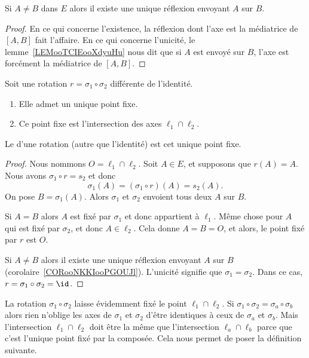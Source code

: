 \begin{corollary}       \label{CORooNKKIooPGOUJl}
	Si \( A\neq B\) dans \( E\) alors il existe une unique réflexion envoyant \( A\) sur \( B\).
\end{corollary}

\begin{proof}
	En ce qui concerne l'existence, la réflexion dont l'axe est la médiatrice de \( [A,B]\) fait l'affaire. En ce qui concerne l'unicité, le lemme~\ref{LEMooTCIEooXdyuHu} nous dit que si \( A\) est envoyé sur \( B\), l'axe est forcément la médiatrice de \( [A,B]\).
\end{proof}

\begin{lemmaDef}        \label{LEMooIJELooLWqBfE}
	Soit une rotation \( r=\sigma_1\circ\sigma_2\) différente de l'identité.
	\begin{enumerate}
		\item
		      Elle admet un unique point fixe.
		\item
		      Ce point fixe est l'intersection des axes \( \ell_1\cap\ell_2\).
	\end{enumerate}

	Le  d'une rotation (autre que l'identité) est cet unique point fixe.
\end{lemmaDef}

\begin{proof}
	Nous nommons \( O=\ell_1\cap\ell_2\). Soit \( A\in E\), et supposons que \( r(A)=A\). Nous avons \( \sigma_1\circ r=s_2\) et donc
	\begin{equation}
		\sigma_1(A)=(\sigma_1\circ r)(A)=s_2(A).
	\end{equation}
	On pose \( B=\sigma_1(A)\). Alors \( \sigma_1\) et \( \sigma_2\) envoient tous deux \( A\) sur \( B\).

	Si \( A=B\) alors \( A\) est fixé par \( \sigma_1\) et donc appartient à \( \ell_1\). Même chose pour \( A\) qui est fixé par \( \sigma_2\), et donc \( A\in\ell_2\). Cela donne \( A=B=O\), et alors, le point fixé par \( r\) est \( O\).

	Si \( A\neq B\) alors il existe une unique réflexion envoyant \( A\) sur \( B\) (corolaire~\ref{CORooNKKIooPGOUJl}). L'unicité signifie que \( \sigma_1=\sigma_2\). Dans ce cas, \( r=\sigma_1\circ\sigma_2=\id\).
\end{proof}

\begin{normaltext}      \label{NORMooDPBOooKkRuTn}
	La rotation \( \sigma_1\circ\sigma_2\) laisse évidemment fixé le point \( \ell_1\cap \ell_2\). Si \( \sigma_1\circ\sigma_2=\sigma_a\circ\sigma_b\) alors rien n'oblige les axes de \( \sigma_1\) et \( \sigma_2\) d'être identiques à ceux de \( \sigma_a\) et \( \sigma_b\). Mais l'intersection \( \ell_1\cap\ell_2\) doit être la même que l'intersection \( \ell_a\cap \ell_b\) parce que c'est l'unique point fixé par la composée. Cela nous permet de poser la définition suivante.
\end{normaltext}


